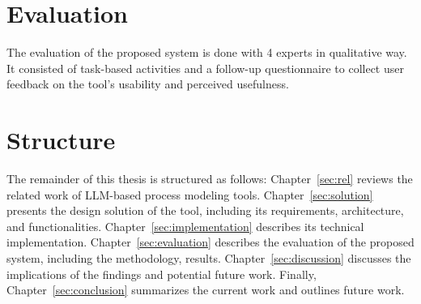 \section{Evaluation}
\label{sec:intro:ev}

The evaluation of the proposed system is done with 4 experts in qualitative way. It consisted of task-based activities and a follow-up questionnaire to collect user feedback on the tool's usability and perceived usefulness.

\section{Structure}
\label{sec:intro:struct}

The remainder of this thesis is structured as follows: Chapter~\ref{sec:rel} reviews the related work of LLM-based process modeling tools. Chapter~\ref{sec:solution} presents the design solution of the tool, including its requirements, architecture, and functionalities. Chapter~\ref{sec:implementation} describes its technical implementation. Chapter~\ref{sec:evaluation} describes the evaluation of the proposed system, including the methodology, results. Chapter~\ref{sec:discussion} discusses the implications of the findings and potential future work. Finally, Chapter~\ref{sec:conclusion} summarizes the current work and outlines future work.
